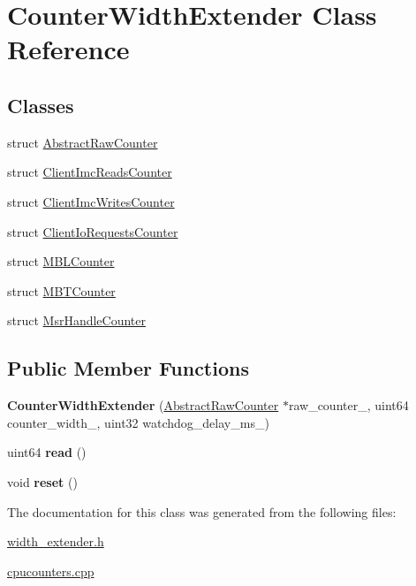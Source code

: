 \hypertarget{class_counter_width_extender}{}\section{Counter\+Width\+Extender Class Reference}
\label{class_counter_width_extender}
\subsection*{Classes}
\begin{DoxyCompactItemize}
\item 
struct \mbox{\hyperlink{struct_counter_width_extender_1_1_abstract_raw_counter}{Abstract\+Raw\+Counter}}
\item 
struct \mbox{\hyperlink{struct_counter_width_extender_1_1_client_imc_reads_counter}{Client\+Imc\+Reads\+Counter}}
\item 
struct \mbox{\hyperlink{struct_counter_width_extender_1_1_client_imc_writes_counter}{Client\+Imc\+Writes\+Counter}}
\item 
struct \mbox{\hyperlink{struct_counter_width_extender_1_1_client_io_requests_counter}{Client\+Io\+Requests\+Counter}}
\item 
struct \mbox{\hyperlink{struct_counter_width_extender_1_1_m_b_l_counter}{M\+B\+L\+Counter}}
\item 
struct \mbox{\hyperlink{struct_counter_width_extender_1_1_m_b_t_counter}{M\+B\+T\+Counter}}
\item 
struct \mbox{\hyperlink{struct_counter_width_extender_1_1_msr_handle_counter}{Msr\+Handle\+Counter}}
\end{DoxyCompactItemize}
\subsection*{Public Member Functions}
\begin{DoxyCompactItemize}
\item 
\mbox{\label{class_counter_width_extender_a3d82385d83e31ef043103407883ee0fd}} 
{\bfseries Counter\+Width\+Extender} (\mbox{\hyperlink{struct_counter_width_extender_1_1_abstract_raw_counter}{Abstract\+Raw\+Counter}} $\ast$raw\+\_\+counter\+\_\+, uint64 counter\+\_\+width\+\_\+, uint32 watchdog\+\_\+delay\+\_\+ms\+\_\+)
\item 
\mbox{\label{class_counter_width_extender_a481ee1b6002b489711f7c8f2e17729f3}} 
uint64 {\bfseries read} ()
\item 
\mbox{\label{class_counter_width_extender_a4b175035962a1f6b925077c3d3e02de1}} 
void {\bfseries reset} ()
\end{DoxyCompactItemize}


The documentation for this class was generated from the following files\+:\begin{DoxyCompactItemize}
\item 
\mbox{\hyperlink{width__extender_8h}{width\+\_\+extender.\+h}}\item 
\mbox{\hyperlink{cpucounters_8cpp}{cpucounters.\+cpp}}\end{DoxyCompactItemize}
